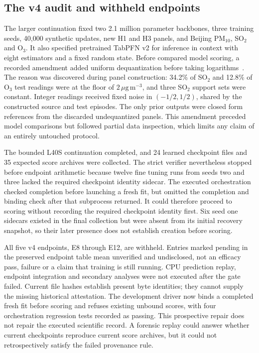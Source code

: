 \subsection{The v4 audit and withheld endpoints}

The larger continuation fixed two 2.1 million parameter backbones, three training seeds, 40,000 synthetic updates, new H1 and H3 panels, and Beijing PM$_{10}$, SO$_2$ and O$_3$. It also specified pretrained TabPFN v2 for inference in context with eight estimators and a fixed random state. Before compared model scoring, a recorded amendment added uniform dequantization before taking logarithms~\citep{theis2016note}. The reason was discovered during panel construction: 34.2\% of SO$_2$ and 12.8\% of O$_3$ test readings were at the floor of $2\,\mu\mathrm{g}\,\mathrm{m}^{-3}$, and three SO$_2$ support sets were constant. Integer readings received fixed noise in $(-1/2,1/2)$, shared by the constructed source and test episodes. The only prior outputs were closed form references from the discarded undequantized panels. This amendment preceded model comparisons but followed partial data inspection, which limits any claim of an entirely untouched protocol.

The bounded L40S continuation completed, and 24 learned checkpoint files and 35 expected score archives were collected. The strict verifier nevertheless stopped before endpoint arithmetic because twelve fine tuning runs from seeds two and three lacked the required checkpoint identity sidecar. The executed orchestration checked completion before launching a fresh fit, but omitted the completion and binding check after that subprocess returned. It could therefore proceed to scoring without recording the required checkpoint identity first. Six seed one sidecars existed in the final collection but were absent from its initial recovery snapshot, so their later presence does not establish creation before scoring.

All five v4 endpoints, E8 through E12, are withheld. Entries marked pending in the preserved endpoint table mean unverified and undisclosed, not an efficacy pass, failure or a claim that training is still running. CPU prediction replay, endpoint integration and secondary analyses were not executed after the gate failed. Current file hashes establish present byte identities; they cannot supply the missing historical attestation. The development driver now binds a completed fresh fit before scoring and refuses existing unbound scores, with four orchestration regression tests recorded as passing. This prospective repair does not repair the executed scientific record. A forensic replay could answer whether current checkpoints reproduce current score archives, but it could not retrospectively satisfy the failed provenance rule.

